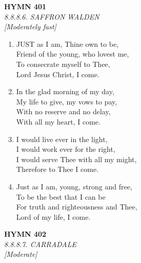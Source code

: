 \documentclass[11pt,a4paper]{article}
\begin{document}
\newpage
\begin{center}
    {\Large \textbf{HYMN 401}}
    \\
    \textit{8.8.8.6. SAFFRON WALDEN}
    \\
    \textit{\small [Moderately fast]}
\end{center}
\vspace{1em}

\begin{enumerate}
    \item JUST as I am, Thine own to be, \\
        Friend of the young, who lovest me, \\
        To consecrate myself to Thee, \\
        Lord Jesus Christ, I come.

    \item In the glad morning of my day, \\
        My life to give, my vows to pay, \\
        With no reserve and no delay, \\
        With all my heart, I come.

    \item I would live ever in the light, \\
        I would work ever for the right, \\
        I would serve Thee with all my might, \\
        Therefore to Thee I come.

    \item Just as I am, young, strong and free, \\
        To be the best that I can be \\
        For truth and righteousness and Thee, \\
        Lord of my life, I come.

\end{enumerate}

\newpage
\begin{center}
    {\Large \textbf{HYMN 402}}
    \\
    \textit{8.8.8.7. CARRADALE}
    \\
    \textit{\small [Moderate]}
\end{center}
\vspace{1em}
\end{document}

